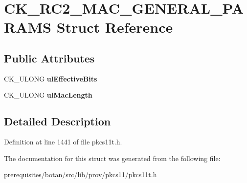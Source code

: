 \hypertarget{struct_c_k___r_c2___m_a_c___g_e_n_e_r_a_l___p_a_r_a_m_s}{}\section{C\+K\+\_\+\+R\+C2\+\_\+\+M\+A\+C\+\_\+\+G\+E\+N\+E\+R\+A\+L\+\_\+\+P\+A\+R\+A\+MS Struct Reference}
\label{struct_c_k___r_c2___m_a_c___g_e_n_e_r_a_l___p_a_r_a_m_s}
\subsection*{Public Attributes}
\begin{DoxyCompactItemize}
\item 
\mbox{\label{struct_c_k___r_c2___m_a_c___g_e_n_e_r_a_l___p_a_r_a_m_s_aa77745a17e02336c24ce0f1a77ba0844}} 
C\+K\+\_\+\+U\+L\+O\+NG {\bfseries ul\+Effective\+Bits}
\item 
\mbox{\label{struct_c_k___r_c2___m_a_c___g_e_n_e_r_a_l___p_a_r_a_m_s_afb7e767a2898dbb3a13e86a2799fc5b5}} 
C\+K\+\_\+\+U\+L\+O\+NG {\bfseries ul\+Mac\+Length}
\end{DoxyCompactItemize}


\subsection{Detailed Description}


Definition at line 1441 of file pkcs11t.\+h.



The documentation for this struct was generated from the following file\+:\begin{DoxyCompactItemize}
\item 
prerequisites/botan/src/lib/prov/pkcs11/pkcs11t.\+h\end{DoxyCompactItemize}
